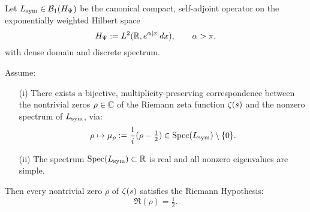 \begin{lemma}
\label{lem:inject_zero_real_spectrum}

Let \( L_{\mathrm{sym}} \in \mathcal{B}_1(H_{\Psi}) \) be the canonical compact, self-adjoint operator on the exponentially weighted Hilbert space
\[
H_{\Psi} := L^2(\mathbb{R}, e^{\alpha |x|} dx), \qquad \alpha > \pi,
\]
with dense domain and discrete spectrum.

Assume:
\begin{enumerate}
  \item[\textup{(i)}] There exists a bijective, multiplicity-preserving correspondence between the nontrivial zeros \( \rho \in \mathbb{C} \) of the Riemann zeta function \( \zeta(s) \) and the nonzero spectrum of \( L_{\mathrm{sym}} \), via:
  \[
  \rho \mapsto \mu_\rho := \frac{1}{i}(\rho - \tfrac{1}{2}) \in \operatorname{Spec}(L_{\mathrm{sym}}) \setminus \{0\}.
  \]

  \item[\textup{(ii)}] The spectrum \( \operatorname{Spec}(L_{\mathrm{sym}}) \subset \mathbb{R} \) is real and all nonzero eigenvalues are simple.
\end{enumerate}

Then every nontrivial zero \( \rho \) of \( \zeta(s) \) satisfies the Riemann Hypothesis:
\[
\Re(\rho) = \tfrac{1}{2}.
\]
\end{lemma}
